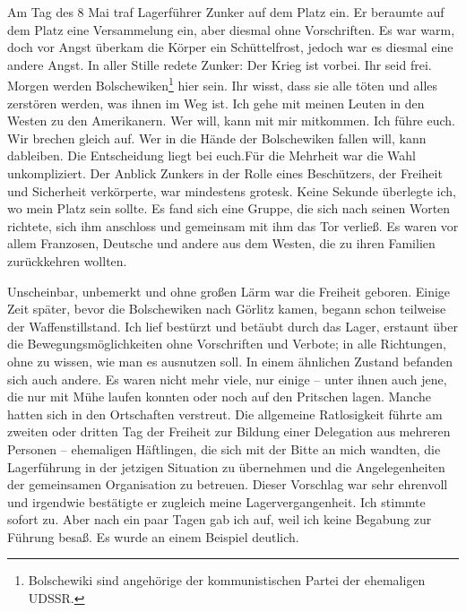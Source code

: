 Am Tag des 8 Mai traf Lagerführer Zunker auf dem Platz ein. Er beraumte auf dem Platz eine Versammelung ein, aber diesmal ohne Vorschriften. Es war warm, doch vor Angst überkam die Körper ein Schüttelfrost, jedoch war es diesmal eine andere Angst. In aller Stille redete Zunker: \glqq Der Krieg ist vorbei. Ihr seid frei. Morgen werden Bolschewiken\footnote{ Bolschewiki sind angehörige der kommunistischen Partei der ehemaligen UDSSR.} hier sein. Ihr wisst, dass sie alle töten und alles zerstören werden, was ihnen im Weg ist. Ich gehe mit meinen Leuten in den Westen zu den Amerikanern. Wer will, kann mit mir mitkommen. Ich führe euch. Wir brechen gleich auf. Wer in die Hände der Bolschewiken fallen will, kann dableiben. Die Entscheidung liegt bei euch.\grqq Für die Mehrheit war die Wahl unkompliziert. Der Anblick Zunkers in der Rolle eines Beschützers, der Freiheit und Sicherheit verkörperte, war mindestens grotesk. Keine Sekunde überlegte ich, wo mein Platz sein sollte. Es fand sich eine Gruppe, die sich nach seinen Worten richtete, sich ihm anschloss und gemeinsam mit ihm das Tor verließ. Es waren vor allem Franzosen, Deutsche und andere aus dem Westen, die zu ihren Familien zurückkehren wollten.

Unscheinbar, unbemerkt und ohne großen Lärm war die Freiheit geboren. Einige Zeit später, bevor die Bolschewiken nach Görlitz kamen, begann schon teilweise der Waffenstillstand. Ich lief bestürzt und betäubt durch das Lager, erstaunt über die Bewegungsmöglichkeiten ohne Vorschriften und Verbote; in alle Richtungen, ohne zu wissen, wie man es ausnutzen soll. In einem ähnlichen Zustand befanden sich auch andere. Es waren nicht mehr viele, nur einige -- unter ihnen auch jene, die nur mit Mühe laufen konnten oder noch auf den Pritschen lagen. Manche hatten sich in den Ortschaften verstreut.
Die allgemeine Ratlosigkeit führte am zweiten oder dritten Tag der Freiheit zur Bildung einer Delegation aus mehreren Personen -- ehemaligen Häftlingen, die sich mit der Bitte an mich wandten, die Lagerführung in der jetzigen Situation zu übernehmen und die Angelegenheiten der gemeinsamen Organisation zu betreuen. Dieser Vorschlag war sehr ehrenvoll und irgendwie bestätigte er zugleich meine Lagervergangenheit. Ich stimmte sofort zu. Aber nach ein paar Tagen gab ich auf, weil ich keine Begabung zur Führung besaß. Es wurde an einem Beispiel deutlich.

